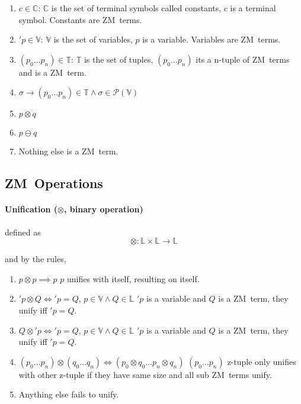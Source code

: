\documentclass[11pt,a4paper]{report}
\newcommand{\zm}{ZM}
\newcommand{\var}[1]{'#1}
\newcommand{\unify}{\otimes}
\newcommand{\notUnify}{\ominus}
\begin{document}
\begin{enumerate}
\item $c \in \mathbb{C}$: $\mathbb{C}$ is the set of terminal symbols called constants, $c$ is a terminal symbol. Constants are \zm\ terms.
\item $'p \in \mathbb{V}$: $\mathbb{V}$ is the set of variables, $p$ is a variable. Variables are \zm\ terms.
\item $(p_{0} \ldots p_{n}) \in \mathbb{T}$: $\mathbb{T}$ is the set of tuples, $(p_{0} \ldots p_{n})$ its a n-tuple of \zm\ terms and is a \zm\ term.
\item $\sigma \rightarrow (p_{0} \ldots p_{n}) \in \mathbb{T} \wedge \sigma \in \mathcal{P}(\mathbb{V})$
\item $p \unify q$
\item $p \notUnify q$
\item Nothing else is a \zm\ term.
\end{enumerate}


\subsection{\zm\ Operations}

\paragraph{Unification ($\unify$, binary operation)} defined as 
\[
    \unify: \mathbb{L} \times \mathbb{L} \rightarrow \mathbb{L}
\] 

and by the rules,

\begin{enumerate}
\item $p \unify p \implies p$
    \subitem $p$ unifies with itself, resulting on itself.

\item $\var{p} \unify Q \iff \var{p} = Q$, $p \in \mathbb{V} \wedge Q \in \mathbb{L}$
    \subitem $\var{p}$ is a variable and $Q$ is a \zm\ term, they unify iff $\var{p} = Q$.

\item $Q \unify \var{p} \iff \var{p} = Q$, $p \in \mathbb{V} \wedge Q \in \mathbb{L}$
    \subitem $\var{p}$ is a variable and $Q$ is a \zm\ term, they unify iff $\var{p} = Q$.

\item $(p_{0} \ldots p_{n}) \unify (q_{0} \ldots q_{n}) \iff (p_{0} \unify q_{0} \ldots p_{n} \unify q_{n})$
    \subitem $(p_{0} \ldots p_{n})$ z-tuple only unifies with other z-tuple if they have same size and all sub \zm\ terms unify.
    
\item Anything else fails to unify.
\end{enumerate}
\end{document}
